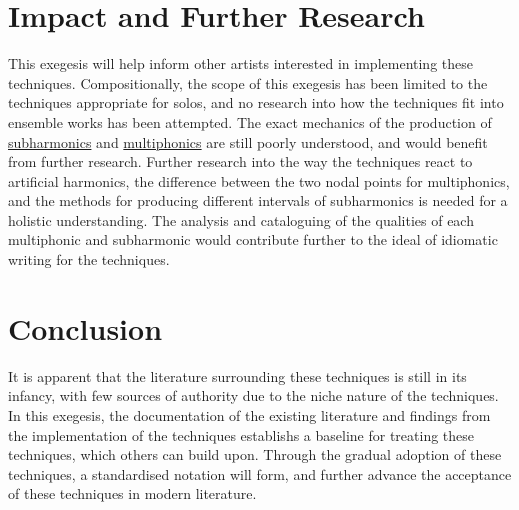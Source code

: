\section{Impact and Further Research}
This exegesis will help inform other artists interested in implementing these techniques. 
Compositionally, the scope of this exegesis has been limited to the techniques appropriate for solos, and no research into how the techniques fit into ensemble works has been attempted.
The exact mechanics of the production of \hyperref[sec:subharmonics]{subharmonics} and \hyperref[sec:multiphonics]{multiphonics} are still poorly understood, and would benefit from further research.
Further research into the way the techniques react to artificial harmonics, the difference between the two nodal points for multiphonics, and the methods for producing different intervals of subharmonics is needed for a holistic understanding.
The analysis and cataloguing of the qualities of each multiphonic and subharmonic would contribute further to the ideal of idiomatic writing for the techniques.


\section{Conclusion}

It is apparent that the literature surrounding these techniques is still in its infancy, with few sources of authority due to the niche nature of the techniques.
In this exegesis, the documentation of the existing literature and findings from the implementation of the techniques establishs a baseline for treating these techniques, which others can build upon.
Through the gradual adoption of these techniques, a standardised notation will form, and further advance the acceptance of these techniques in modern literature.

